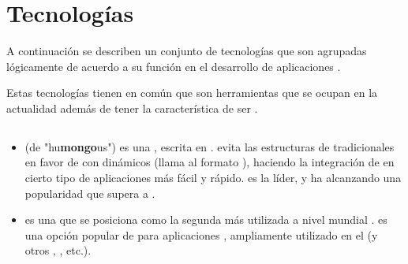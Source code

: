 
\section{Tecnologías }\label{cap:estadoArte:tecnologias}
A continuación se describen un conjunto de tecnologías que son agrupadas lógicamente de acuerdo a su función en el desarrollo de aplicaciones \webINT.

Estas tecnologías tienen en común que son herramientas que se ocupan en la actualidad además de tener la característica de ser \openSourcePC. 

\subsection{\dataBasesDB}

	\begin{itemize}
		\item
			\textbf{\mongodbNAME} (de "hu\textbf{mongo}us") es una \dataBasesDB \documentOriented \openSourcePC, escrita en \cPlusPlus \cite{technology_mongodb}. \mongodbNAME evita las estructuras de \dataBasesDB tradicionales \tableBasedDB en favor de \documentsDB \jsonLikeCPT con \schemasDB dinámicos (\mongodbNAME llama al formato \bsonNAME), haciendo la integración de \dataPC en cierto tipo de aplicaciones más fácil y rápido. \mongodbNAME es la \nosqlNAME líder, y ha alcanzando una popularidad que supera a \postgresql \cite{online_db_engines_ranking}.
	
		\item
			\textbf{\mysqlNAME} es una \rdbms \openSourcePC que se posiciona como la segunda más utilizada a nivel mundial \cite{online_db_engines_ranking}\cite{online_dispelling_myths}. \mysqlNAME es una opción popular de \dataBasesDB para aplicaciones \webINT, ampliamente utilizado en el \stackAS \lampNAME (y otros \stacksAS, \ampNAME, etc.).
	

\end{itemize}

